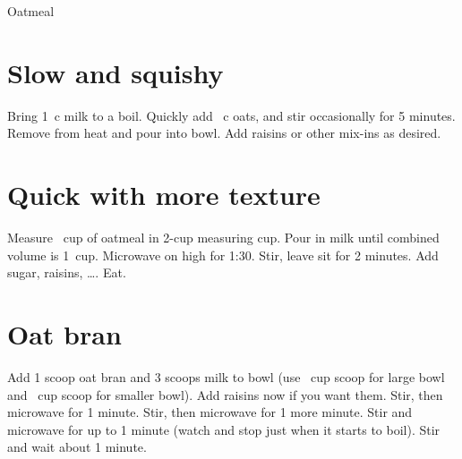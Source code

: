 
\begin{recipe}{Oatmeal}
  \maketitle

  \section{Slow and squishy}
  Bring 1\half~c milk to a boil. Quickly add \threefourths~c oats, and stir
  occasionally for 5 minutes. Remove from heat and pour into bowl. Add raisins or
  other mix-ins as desired.

  \section{Quick with more texture}
  Measure \twothirds~cup of oatmeal in 2-cup measuring {cup}. Pour in milk
  until combined volume is 1~cup. Microwave on high for 1:30. Stir, leave
  sit for 2 minutes. Add sugar, raisins, \dots. Eat.

  \section{Oat bran}
  Add 1 scoop oat bran and 3 scoops milk to bowl (use \third~cup scoop for
  large bowl and \fourth~cup scoop for smaller bowl). Add raisins now if
  you want them. Stir, then microwave for 1 minute. Stir, then microwave
  for 1 more minute. Stir and microwave for up to 1 minute (watch and stop
  just when it starts to boil). Stir and wait about 1 minute.
\end{recipe}

